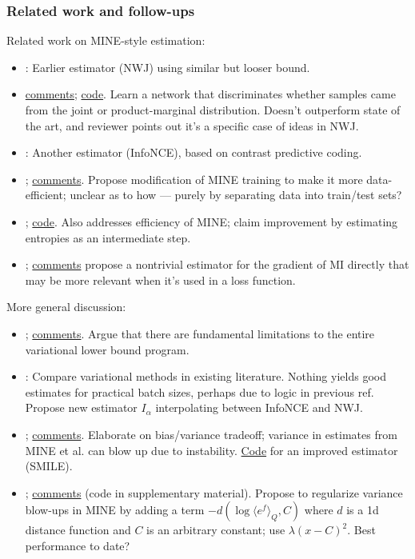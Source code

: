 \documentclass[notitlepage,openany,11pt]{report}
\theoremstyle{plain}%
\numberwithin{equation}{section}
\begin{document}
\subsubsection{Related work and follow-ups}

Related work on MINE-style estimation:
\begin{itemize}
\item \cite{NguyenEtAl:10}: Earlier estimator (NWJ) using similar but looser bound.
\item \cite{LiaoEtAl:20} \href{https://openreview.net/forum?id=3LujMJM9EMp}{comments}; \href{https://github.com/RayRuizhiLiao/demi_mi_estimator}{code}. Learn a network that discriminates whether samples came from the joint or product-marginal distribution. Doesn't outperform state of the art, and reviewer points out it's a specific case of ideas in NWJ.
\item \cite{OordEtAl:19}: Another estimator (InfoNCE), based on contrast predictive coding.
\item \cite{LinEtAl:19}; \href{https://openreview.net/forum?id=SklOypVKvS}{comments}. Propose modification of MINE training to make it more data-efficient; unclear as to how --- purely by separating data into train/test sets?
\item \cite{ChanEtAl:19}; \href{https://github.com/ccha23/MI-NEE}{code}. Also addresses efficiency of MINE; claim improvement by estimating entropies as an intermediate step.
\item \cite{WenEtAl:20}; \href{https://openreview.net/forum?id=ByxaUgrFvH}{comments} propose a nontrivial estimator for the gradient of MI directly that may be more relevant when it's used in a loss function.
\end{itemize}

More general discussion:
\begin{itemize}
\item \cite{McAllesterStratos:20}; \href{https://openreview.net/forum?id=BkedwoC5t7}{comments}. Argue that there are fundamental limitations to the entire variational lower bound program. 
\item \cite{PooleOzair:19}: Compare variational methods in existing literature. Nothing yields good estimates for practical batch sizes, perhaps due to logic in previous ref. Propose new estimator $I_{\alpha}$ interpolating between InfoNCE and NWJ.
\item \cite{SongErmon:20}; \href{https://openreview.net/forum?id=B1x62TNtDS}{comments}. Elaborate on bias/variance tradeoff; variance in estimates from MINE et al. can blow up due to instability. \href{https://github.com/ermongroup/smile-mi-estimator}{Code} for an improved estimator (SMILE).
\item \cite{ChoiLee:20}; \href{https://openreview.net/forum?id=Lvb2BKqL49a}{comments} (code in supplementary material). Propose to  regularize variance blow-ups in MINE by adding a term $- d( \log \langle e^f \rangle_{Q}, C)$ where $d$ is a 1d distance function and $C$ is an arbitrary constant; use $\lambda (x-C)^{2}$. Best performance to date?
\end{itemize}
\end{document}
